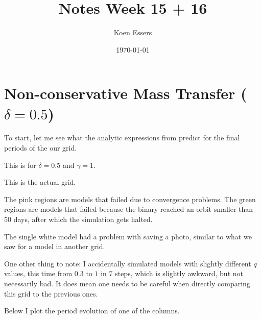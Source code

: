 \documentclass[a4paper,10pt]{article}
\title{Notes Week 15 + 16}
\author{Koen Essers}
\date{\today}
\begin{document}
\setuplayout

\section{Non-conservative Mass Transfer (\texorpdfstring{\(\delta = 0.5\)}{delta = 0.5})}\label{sec:ncmt}

To start, let me see what the analytic expressions from \citet{soberman1997} predict for the final periods of the our grid.

This is for \(\delta =0.5\) and \(\gamma =1\).
\begin{figure}[ht]
    \centering
\end{figure}

This is the actual grid.
\begin{figure}[ht]
    \centering
\end{figure}

The pink regions are models that failed due to convergence problems. The green regions are models that failed because the binary reached an orbit smaller than 50 days, after which the simulation gets halted.

The single white model had a problem with saving a photo, similar to what we saw for a model in another grid.

One other thing to note: I accidentally simulated models with slightly different \(q\) values, this time from \(0.3\) to \(1\) in \(7\) steps, which is slightly awkward, but not necessarily bad. It does mean one needs to be careful when directly comparing this grid to the previous ones.

Below I plot the period evolution of one of the columns.
\end{document}
